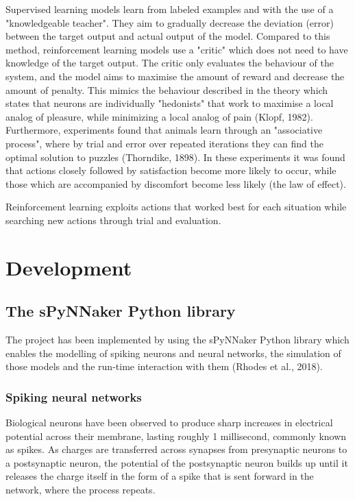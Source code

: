 \documentclass[10pt]{article}
\begin{document}
    Supervised learning models learn from labeled examples and with the use of a "knowledgeable teacher". They aim to gradually decrease the deviation (error) between the target output and actual output of the model. Compared to this method, reinforcement learning models use a "critic" which does not need to have knowledge of the target output. The critic only evaluates the behaviour of the system, and the model aims to maximise the amount of reward and decrease the amount of penalty. This mimics the behaviour described in the theory which states that neurons are individually "hedonists" that work to maximise a local analog of pleasure, while minimizing a local analog of pain (Klopf, 1982). Furthermore, experiments found that animals learn through an "associative process", where by trial and error over repeated iterations they can find the optimal solution to puzzles (Thorndike, 1898). In these experiments it was found that actions closely followed by satisfaction become more likely to occur, while those which are accompanied by discomfort become less likely (the law of effect).

    Reinforcement learning exploits actions that worked best for each situation while searching new actions through trial and evaluation.
    
    \section{Development}

    \subsection{The sPyNNaker Python library}

    The project has been implemented by using the sPyNNaker Python library which enables the modelling of spiking neurons and neural networks, the simulation of those models and the run-time interaction with them (Rhodes et al., 2018).

    \subsubsection{Spiking neural networks}

    Biological neurons have been observed to produce sharp increases in electrical potential across their membrane, lasting roughly 1 millisecond, commonly known as spikes. As charges are transferred across synapses from presynaptic neurons to a postsynaptic neuron, the potential of the postsynaptic neuron builds up until it releases the charge itself in the form of a spike that is sent forward in the network, where the process repeats.
\end{document}
